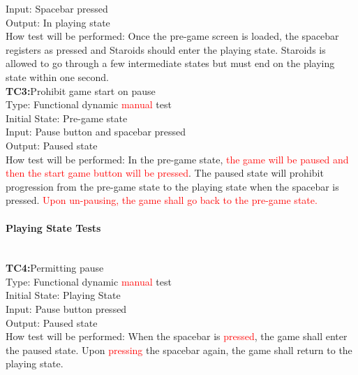 \documentclass[12pt, titlepage]{article}
\begin{document}
Input: Spacebar pressed\\

Output: In playing state\\

How test will be performed: Once the pre-game screen is loaded, the spacebar registers as pressed and Staroids should enter the playing state. Staroids is allowed to go through a few intermediate states but must end on the playing state within one second.\\

\textbf{TC3:}Prohibit game start on pause\\

Type: Functional dynamic \textcolor{red}{manual} test\\

Initial State: Pre-game state\\

Input: Pause button and spacebar pressed\\

Output: Paused state\\

How test will be performed: In the pre-game state, \textcolor{red}{the game will be paused and then the start game button will be pressed}. The paused state will prohibit progression from the pre-game state to the playing state when the spacebar is pressed. \textcolor{red}{Upon un-pausing, the game shall go back to the pre-game state.}\\


\paragraph{Playing State Tests\\\\}

\textbf{TC4:}Permitting pause\\

Type: Functional dynamic \textcolor{red}{manual} test\\

Initial State: Playing State\\

Input: Pause button pressed\\

Output: Paused state\\

How test will be performed: When the spacebar is \textcolor{red}{pressed}, the game shall enter the paused state. Upon \textcolor{red}{pressing} the spacebar again, the game shall return to the playing state.\\
\end{document}
